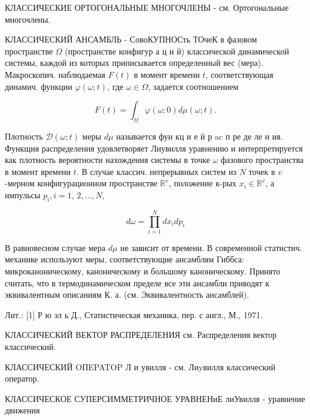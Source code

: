 \documentclass[10pt]{article}
\begin{document}
КЛАССИЧЕСКИЕ ОРТОГОНАЛЬНЫЕ МНОГОЧЛЕНЫ - см. Ортогональные многочлены.



КЛАССИЧЕСКИЙ АНСАМБЛЬ - СовоКУПНОСть ТОчеК в фазовом пространстве $\Omega$ (пространстве конфигур а ц и й) классической динамической системы, каждой из которых приписывается определенный вес (мера). Макроскопич. наблюдаемая $F(t)$ в момент времени $t$, соответствующая динамич. функции $\varphi(\omega ; t)$, где $\omega \in \Omega$, задается соотношением



\[

F(t)=\int_{\Omega} \varphi(\omega ; 0) d \mu(\omega ; t) .

\]



Плотность $\mathscr{D}(\omega ; t)$ меры $d \mu$ называется фун кц и е й р ac п ре де ле н ия. Функщия распределения удовлетворяет Лиувилля уравнению и интерпретируется как плотность вероятности нахождения системы в точке $\omega$ фазового пространства в момент времени $t$. В случае классич. непрерывных систем из $N$ точек в $v$-мерном конфигурационном пространстве $\mathbb{R}^{v}$, положение к-рых $x_{i} \in \mathbb{R}^{v}$, а импульсы $p_{i}, i=1$, $2, \ldots, N$,



\[

d \omega=\prod_{i=1}^{N} d x_{i} d p_{i}

\]



В равновесном случае мера $d \mu$ не зависит от времени. В современной статистич. механике используют меры, соответствующие ансамблям Гиббса: микроканоническому, каноническому и большому каноническому. Принято считать, что в термодинамическом пределе все эти ансамбли приводят к эквивалентным описаниям К. а. (см. Эквивалентность ансамблей).



Лит.: [1] Р ю эл ь Д., Статистическая механика, пер. с англ., М., 1971.



КЛАССИЧЕСКИЙ ВЕКТОР РАСПРЕДЕЛЕНИЯ см. Распределения вектор классический.



КЛАССИЧЕСКИЙ OПEPATOP Л и увилля - см. Лиyвилля классический оператор.



КЛАССИЧЕСКОЕ СУПЕРСИММЕТРИЧНОЕ УРАВНЕНиЕ лиУвилля - уравнение движения
\end{document}
